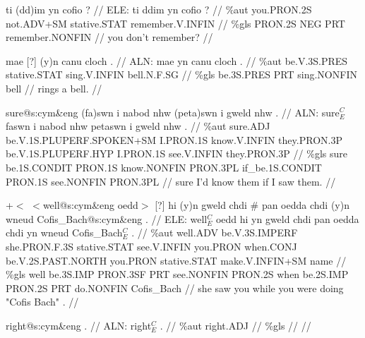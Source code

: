 \documentclass[a4paper,10pt]{article}
\begin{document}
\ex
\begingl[lingstyle=gergl]
\glchat ti (dd)im yn cofio ? //
\glsurface ELE:  ti ddim yn cofio ?  //
\glauto \%aut  you{\scriptsize .PRON.2S} not{\scriptsize .ADV+SM} stative{\scriptsize .STAT} remember{\scriptsize .V.INFIN}   //
\glmanual \%gls  PRON{\scriptsize .2S} NEG PRT remember{\scriptsize .NONFIN}   //
\gleng you don't remember? //
\endgl
\xe

\ex
\begingl[lingstyle=gergl]
\glchat mae [?] (y)n canu cloch . //
\glsurface ALN:  mae yn canu cloch .  //
\glauto \%aut  be{\scriptsize .V.3S.PRES} stative{\scriptsize .STAT} sing{\scriptsize .V.INFIN} bell{\scriptsize .N.F.SG}   //
\glmanual \%gls  be{\scriptsize .3S.PRES} PRT sing{\scriptsize .NONFIN} bell   //
\gleng rings a bell. //
\endgl
\xe

\ex
\begingl[lingstyle=gergl]
\glchat sure@s:cym\&eng (fa)swn i nabod nhw (peta)swn i gweld nhw . //
\glsurface ALN:  sure$^{C}_{E}$ faswn i nabod nhw petaswn i gweld nhw .  //
\glauto \%aut  sure{\scriptsize .ADJ} be{\scriptsize .V.1S.PLUPERF.SPOKEN+SM} I{\scriptsize .PRON.1S} know{\scriptsize .V.INFIN} they{\scriptsize .PRON.3P} be{\scriptsize .V.1S.PLUPERF.HYP} I{\scriptsize .PRON.1S} see{\scriptsize .V.INFIN} they{\scriptsize .PRON.3P}   //
\glmanual \%gls  sure be{\scriptsize .1S.CONDIT} PRON{\scriptsize .1S} know{\scriptsize .NONFIN} PRON{\scriptsize .3PL} if\_be{\scriptsize .1S.CONDIT} PRON{\scriptsize .1S} see{\scriptsize .NONFIN} PRON{\scriptsize .3PL}   //
\gleng sure I'd know them if I saw them. //
\endgl
\xe

\ex
\begingl[lingstyle=gergl]
\glchat +$<$ $<$well@s:cym\&eng oedd$>$ [?] hi (y)n gweld chdi \# pan oedda chdi (y)n wneud Cofis\_Bach@s:cym\&eng . //
\glsurface ELE:  well$^{C}_{E}$ oedd hi yn gweld chdi pan oedda chdi yn wneud Cofis\_Bach$^{C}_{E}$ .  //
\glauto \%aut  well{\scriptsize .ADV} be{\scriptsize .V.3S.IMPERF} she{\scriptsize .PRON.F.3S} stative{\scriptsize .STAT} see{\scriptsize .V.INFIN} you{\scriptsize .PRON} when{\scriptsize .CONJ} be{\scriptsize .V.2S.PAST.NORTH} you{\scriptsize .PRON} stative{\scriptsize .STAT} make{\scriptsize .V.INFIN+SM} name   //
\glmanual \%gls  well be{\scriptsize .3S.IMP} PRON{\scriptsize .3SF} PRT see{\scriptsize .NONFIN} PRON{\scriptsize .2S} when be{\scriptsize .2S.IMP} PRON{\scriptsize .2S} PRT do{\scriptsize .NONFIN} Cofis\_Bach   //
\gleng she saw you while you were doing "Cofis Bach" . //
\endgl
\xe

\ex
\begingl[lingstyle=gergl]
\glchat right@s:cym\&eng . //
\glsurface ALN:  right$^{C}_{E}$ .  //
\glauto \%aut  right{\scriptsize .ADJ}   //
\glmanual \%gls     //
\gleng  //
\endgl
\xe
\end{document}
